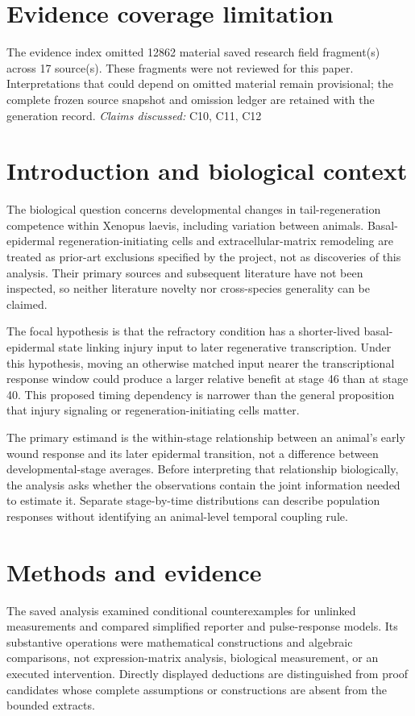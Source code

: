\documentclass[11pt]{article}
\begin{document}
\section*{Evidence coverage limitation}
The evidence index omitted 12862 material saved research field fragment(s) across 17 source(s). These fragments were not reviewed for this paper. Interpretations that could depend on omitted material remain provisional; the complete frozen source snapshot and omission ledger are retained with the generation record.
\textit{Claims discussed: }C10, C11, C12
\section{Introduction and biological context}
The biological question concerns developmental changes in tail-regeneration competence within Xenopus laevis, including variation between animals. Basal-epidermal regeneration-initiating cells and extracellular-matrix remodeling are treated as prior-art exclusions specified by the project, not as discoveries of this analysis. Their primary sources and subsequent literature have not been inspected, so neither literature novelty nor cross-species generality can be claimed.

The focal hypothesis is that the refractory condition has a shorter-lived basal-epidermal state linking injury input to later regenerative transcription. Under this hypothesis, moving an otherwise matched input nearer the transcriptional response window could produce a larger relative benefit at stage 46 than at stage 40. This proposed timing dependency is narrower than the general proposition that injury signaling or regeneration-initiating cells matter.

The primary estimand is the within-stage relationship between an animal's early wound response and its later epidermal transition, not a difference between developmental-stage averages. Before interpreting that relationship biologically, the analysis asks whether the observations contain the joint information needed to estimate it. Separate stage-by-time distributions can describe population responses without identifying an animal-level temporal coupling rule.

\section{Methods and evidence}
The saved analysis examined conditional counterexamples for unlinked measurements and compared simplified reporter and pulse-response models. Its substantive operations were mathematical constructions and algebraic comparisons, not expression-matrix analysis, biological measurement, or an executed intervention. Directly displayed deductions are distinguished from proof candidates whose complete assumptions or constructions are absent from the bounded extracts.
\end{document}
